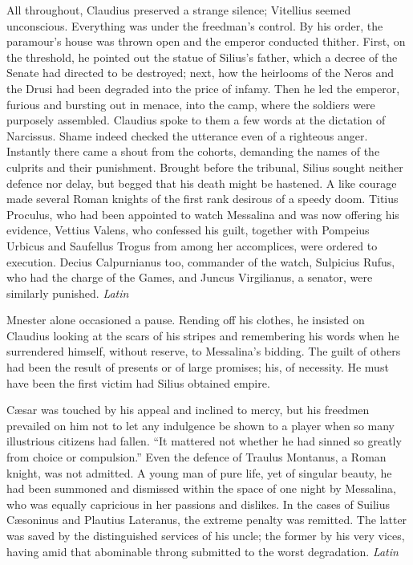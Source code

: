 All throughout, Claudius preserved a strange silence; Vitellius seemed unconscious. Everything was under the freedman's control. By his order, the paramour's house was thrown open and the emperor conducted thither. First, on the threshold, he pointed out the statue of Silius's father, which a decree of the Senate had directed to be destroyed; next, how the heirlooms of the Neros and the Drusi had been degraded into the price of infamy. Then he led the emperor, furious and bursting out in menace, into the camp, where the soldiers were purposely assembled. Claudius spoke to them a few words at the dictation of Narcissus. Shame indeed checked the utterance even of a righteous anger. Instantly there came a shout from the cohorts, demanding the names of the culprits and their punishment. Brought before the tribunal, Silius sought neither defence nor delay, but begged that his death might be hastened. A like courage made several Roman knights of the first rank desirous of a speedy doom. Titius Proculus, who had been appointed to watch Messalina and was now offering his evidence, Vettius Valens, who confessed his guilt, together with Pompeius Urbicus and Saufellus Trogus from among her accomplices, were ordered to execution. Decius Calpurnianus too, commander of the watch, Sulpicius Rufus, who had the charge of the Games, and Juncus Virgilianus, a senator, were similarly punished. \emph{Latin}


Mnester alone occasioned a pause. Rending off his clothes, he insisted on Claudius looking at the scars of his stripes and remembering his words when he surrendered himself, without reserve, to Messalina's bidding. The guilt of others had been the result of presents or of large promises; his, of necessity. He must have been the first victim had Silius obtained empire.

Cæsar was touched by his appeal and inclined to mercy, but his freedmen prevailed on him not to let any indulgence be shown to a player when so many illustrious citizens had fallen. ``It mattered not whether he had sinned so greatly from choice or compulsion.'' Even the defence of Traulus Montanus, a Roman knight, was not admitted. A young man of pure life, yet of singular beauty, he had been summoned and dismissed within the space of one night by Messalina, who was equally capricious in her passions and dislikes. In the cases of Suilius Cæsoninus and Plautius Lateranus, the extreme penalty was remitted. The latter was saved by the distinguished services of his uncle; the former by his very vices, having amid that abominable throng submitted to the worst degradation. \emph{Latin}

